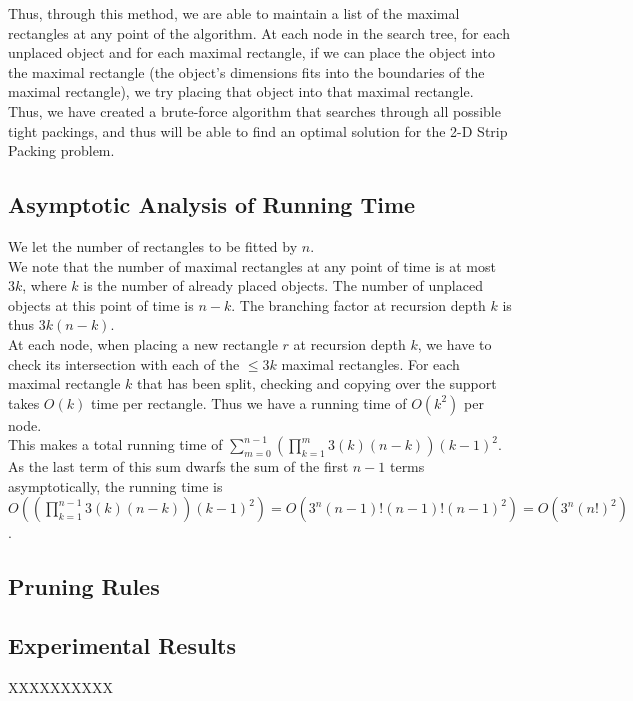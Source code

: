 \documentclass{article}
\begin{document}
\begin{defn}
\begin{defn}
\begin{dfn}
\begin{dfn}
Thus, through this method, we are able to maintain a list of the maximal rectangles at any point of the algorithm. At each node in the search tree, for each unplaced object and for each maximal rectangle, if we can place the object into the maximal rectangle (the object's dimensions fits into the boundaries of the maximal rectangle), we try placing that object into that maximal rectangle. Thus, we have created a brute-force algorithm that searches through all possible tight packings, and thus will be able to find an optimal solution for the 2-D Strip Packing problem.\\

\subsection{Asymptotic Analysis of Running Time}
We let the number of rectangles to be fitted by $n$.\\
We note that the number of maximal rectangles at any point of time is at most $3k$, where $k$ is the number of already placed objects. The number of unplaced objects at this point of time is $n-k$. The branching factor at recursion depth $k$ is thus $3k(n-k)$.\\

At each node, when placing a new rectangle $r$ at recursion depth $k$, we have to check its intersection with each of the $\leq 3k$ maximal rectangles. For each maximal rectangle $k$ that has been split, checking and copying over the support takes $O(k)$ time per rectangle. Thus we have a running time of $O(k^2)$ per node.\\

This makes a total running time of $\displaystyle\sum_{m=0}^{n-1} (\prod_{k=1}^{m} 3(k)(n-k))(k-1)^2$. As the last term of this sum dwarfs the sum of the first $n-1$ terms asymptotically, the running time is $O((\prod_{k=1}^{n-1} 3(k)(n-k))(k-1)^2) = O(3^n(n-1)!(n-1)!(n-1)^2) = O(3^n(n!)^2)$.

\subsection{Pruning Rules}



\subsection{Experimental Results}


XXXXXXXXXX


\end{dfn}
\end{dfn}
\end{defn}
\end{defn}
\end{document}
